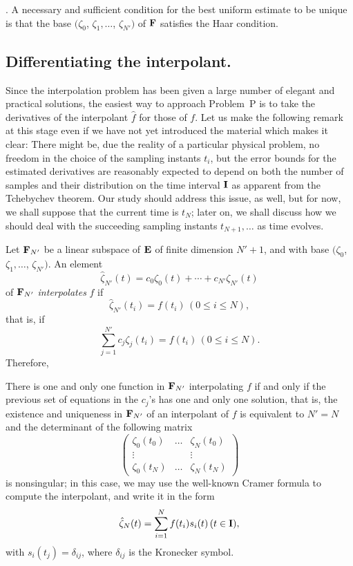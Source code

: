 \begin{theorem}.\label{thm1}
A necessary and sufficient condition for the best uniform estimate to be
unique is that the base $(\zeta_0$, $\zeta_1, \ldots$, $\zeta_{N'})$ of ${\bf F}$
satisfies the Haar condition.
\end{theorem}

\subsection{Differentiating the interpolant.}
Since the interpolation problem has been given a large number of elegant
and practical solutions, the easiest way to approach Problem~P is to take
the derivatives of the interpolant $\hat f$ for those of $f$.
Let us make the following remark at this stage even if we have not yet
introduced the material which makes it clear:
There might be, due the reality of a particular
physical problem, no freedom in the choice of the sampling instants $t_i$,
but the error bounds for the estimated derivatives are
reasonably expected to depend on both the number of
samples and  their distribution on the time interval ${\bf I}$ as apparent from
the Tchebychev theorem.
Our study should address this issue, as well, but
for now, we shall suppose that the current time is $t_N$; later on, we shall
discuss how we should deal with the succeeding sampling instants $t_{N+1},
\ldots$ as time evolves.

Let ${\bf F}_{N'}$ be a linear subspace of ${\bf E}$ of finite dimension $N'+1$, and
with base $(\zeta_0$, $\zeta_1, \ldots$, $\zeta_{N'})$.
An element
$$
\hat \zeta_{N'}(t) = c_0\zeta_0(t) + \cdots + c_{N'}\zeta_{N'}(t)
$$
of ${\bf F}_{N'}$ {\it interpolates} $f$ if
$$
\hat \zeta_{N'}(t_i) = f(t_i) \, (0 \le i \le N),
$$
that is, if
$$
\sum_{j=1}^{N'}c_j\zeta_j(t_i) = f(t_i) \, (0 \le i \le N).
$$
Therefore,

\begin{theorem}\label{thm2}
There is one and only one function in ${\bf F}_{N'}$ interpolating $f$
if and only if the previous set of equations in the $c_j$'s has one and only one
solution, that is, the existence and uniqueness in ${\bf F}_{N'}$ of an
interpolant of $f$ is equivalent to $N' = N$ and the determinant of the
following matrix
$$\left( \begin{array}{ccc}
\zeta_0(t_0)&\ldots&\zeta_N(t_0)\\
         \vdots&&\vdots\\
         \zeta_0(t_N)&\ldots&\zeta_N(t_N)\end{array} \right)$$
is nonsingular; in this case, we may use the well-known Cramer formula to
compute the interpolant, and write it in the form
$$
\hat \zeta_N(t) = \sum_{i=1}^{N}f(t_i)s_i(t) \, (t \in {\bf I}),
$$
with $s_i(t_j) = \delta_{ij}$, where $\delta_{ij}$ is the Kronecker symbol.
\end{theorem}

